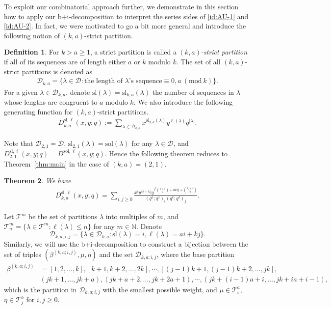 \documentclass[11pt,reqno]{amsart}
\numberwithin{equation}{section}
\theoremstyle{plain}
\newtheorem{theorem}{Theorem}[section]
\theoremstyle{definition}
\newtheorem{Def}[theorem]{Definition}
\def\mod{\mathrm{mod}}
\def\sol{\mathrm{sol}}
\def\sl{\mathrm{sl}}
\def\la{\lambda}
\def\N{\mathbb{N}}
\def\T{\mathcal{T}}
\newcommand{\D}{\mathcal{D}}
\begin{document}
To exploit our combinatorial approach further, we demonstrate in this section how to apply our b$+$i-decomposition to interpret the series sides of \eqref{id:AU-1} and \eqref{id:AU-2}. In fact, we were motivated to go a bit more general and introduce the following notion of $(k,a)$-strict partition.
\begin{Def}
For $k>a\ge 1$, a strict partition is called a {\it $(k,a)$-strict partition} if all of its sequences are of length either $a$ or $k$ modulo $k$. The set of all $(k,a)$-strict partitions is denoted as
\begin{align*}
\D_{k,a}=\{\la\in \D: \text{the length of $\la$'s sequence}\equiv 0, a~(\mod\ k)\}.
\end{align*}
For a given $\la\in\D_{k,a}$, denote $\sl(\la)=\sl_{k,a}(\la)$ the number of sequences in $\la$ whose lengths are congruent to $a$ modulo $k$. We also introduce the following generating function for $(k,a)$-strict partitions.
\begin{align*}
D^{\sl, \ell}_{k,a}(x, y; q):=\sum_{\la\in \D_{k,a}}x^{\sl_{k,a}(\la)}y^{\ell(\la)}q^{|\la|}.
\end{align*}
\end{Def}

Note that $\D_{2,1}=\D$, $\sl_{2,1}(\la)=\sol(\la)$ for any $\la\in\D$, and $D_{2,1}^{\sl,\ell}(x,y;q)=D^{\sol,\ell}(x,y;q)$. Hence the following theorem reduces to Theorem~\ref{thm:main} in the case of $(k,a)=(2,1)$. 

\begin{theorem}\label{thm:main-ka}
We have
\begin{align*}
D^{\sl, \ell}_{k,a}(x, y; q)=\sum_{i, j\geq 0}\frac{x^{i}y^{ai+kj}q^{i^2\binom{a+1}{2}+akij+\binom{kj+1}{2}}}{(q^a; q^a)_i(q^k; q^k)_j}.
\end{align*}
\end{theorem}

Let $\T^m$ be the set of partitions $\la $ into multiples of $m$, and $\T^m_n=\{\la\in \T^m: \ell(\la)\leq n\}$ for any $m\in \N$. Denote 
$$
\D_{k, a; i, j}=\{\la\in \D_{k, a}: \sl(\la)=i, \ell(\la)=ai+kj\}.
$$
Similarly, we will use the b+i-decomposition to construct a bijection between the set of triples $(\beta^{(k, a; i, j)}, \mu, \eta)$ and the set $\D_{k, a; i, j}$, where the base partition
\begin{align*}
\beta^{(k, a; i, j)}&=[1, 2,\ldots, k], [k+1, k+2,\ldots, 2k], \cdots, [(j-1)k+1, (j-1)k+2,\ldots, jk], \\
&(jk+1,\ldots, jk+a), (jk+a+2,\ldots, jk+2a+1), \cdots, (jk+(i-1)a+i,\ldots, jk+ia+i-1),
\end{align*}
which is the partition in $\D_{k,a;i,j}$ with the smallest possible weight, and $\mu\in \T^a_i$, $\eta\in \T^k_j$ for $i, j\geq 0$. 
\end{document}
